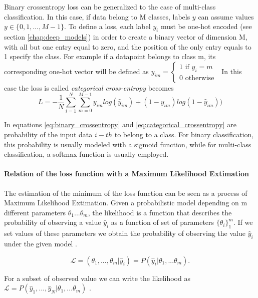 \documentclass[11pt]{report}
\begin{document}
Binary crossentropy loss can be generalized to the case of multi-class classification.
In this case, if data belong to M classes, labels $y$ can assume values $y \in \{0, 1, ..., M-1\}$.
To define a loss, each label $y_i$ must be one-hot encoded (see section \ref{chap:deep_models}) in order to create a binary vector of dimension M, with all but one entry equal to zero, and the position of the only entry equals to 1 specify the class.
For example if a datapoint belongs to class m, its corresponding one-hot vector will be defined as $y_{im} = \begin{cases} 1  \text{ if } y_i = m \\ 0 \text{ otherwise }\end{cases}$
In this case the loss is called \emph{categorical cross-entropy} becomes
\begin{equation}\label{eq:categorical_crossentropy}
L = -\frac{1}{N} \sum_{i=1}^N \sum_{m=0}^{M-1}y_{im} log(\hat y_{im}) + (1-y_{im})log(1- \hat y_{im}))
\end{equation}

In equations \ref{eq:binary_crossentropy} and \ref{eq:categorical_crossentropy} are probability of the input data $i-th$ to belong to a class.
For binary classification, this probability is usually modeled with a sigmoid function, while for multi-class classification, a softmax function is usually employed.

\paragraph{Relation of the loss function with a Maximum Likelihood Extimation}\hfill

\noindent The estimation of the minimum of the loss function can be seen as a process of Maximum Likelihood Extimation.
Given a probabilistic model depending on m different parameters $\theta_1 ... \theta_m$, the likelihood is a function that describes the probability of observing a value $\hat y_i$ as a function of set of parameters $\{\theta_i \}_1 ^m$.
If we set values of these parameters we obtain the probability of observing the value $\hat y_i$ under the given model \cite{baldini2021}.

\begin{equation}
 \mathcal{L} = (\theta_1, ..., \theta_m | \hat y_i) = P(\hat y_i|\theta_1, ...\theta_m).
\end{equation}

For a subset of observed value we can write the likelihood as $\mathcal{L} = P(\hat y_1, ..., \hat y_N | \theta_1, ...\theta_m)$ .
\end{document}
